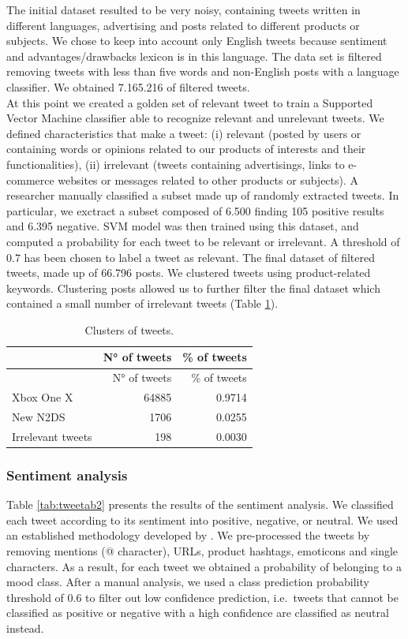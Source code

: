 \documentclass[]{book}
\begin{document}
The initial dataset resulted to be very noisy, containing tweets written
in different languages, advertising and posts related to different
products or subjects. We chose to keep into account only English tweets
because sentiment and advantages/drawbacks lexicon is in this language.
The data set is filtered removing tweets with less than five words and
non-English posts with a language classifier. We obtained 7.165.216 of
filtered tweets.\\
At this point we created a golden set of relevant tweet to train a
Supported Vector Machine classifier able to recognize relevant and
unrelevant tweets. We defined characteristics that make a tweet: (i)
relevant (posted by users or containing words or opinions related to our
products of interests and their functionalities), (ii) irrelevant
(tweets containing advertisings, links to e-commerce websites or
messages related to other products or subjects). A researcher manually
classified a subset made up of randomly extracted tweets. In particular,
we exctract a subset composed of 6.500 finding 105 positive results and
6.395 negative. SVM model was then trained using this dataset, and
computed a probability for each tweet to be relevant or irrelevant. A
threshold of 0.7 has been chosen to label a tweet as relevant. The final
dataset of filtered tweets, made up of 66.796 posts. We clustered tweets
using product-related keywords. Clustering posts allowed us to further
filter the final dataset which contained a small number of irrelevant
tweets (Table \ref{tab:tweetab1}).

\begin{longtable}[]{@{}lrr@{}}
\caption{\label{tab:tweetab1} Clusters of tweets.}\tabularnewline
\toprule
& N° of tweets & \% of tweets\tabularnewline
\midrule
\endfirsthead
\toprule
& N° of tweets & \% of tweets\tabularnewline
\midrule
\endhead
Xbox One X & 64885 & 0.9714\tabularnewline
New N2DS & 1706 & 0.0255\tabularnewline
Irrelevant tweets & 198 & 0.0030\tabularnewline
\bottomrule
\end{longtable}

\subsubsection*{Sentiment analysis}\label{sentiment-analysis}

Table \ref{tab:tweetab2} presents the results of the sentiment analysis.
We classified each tweet according to its sentiment into positive,
negative, or neutral. We used an established methodology developed by
\citep{cimino2014linguistically}. We pre-processed the tweets by
removing mentions (@ character), URLs, product hashtags, emoticons and
single characters. As a result, for each tweet we obtained a probability
of belonging to a mood class. After a manual analysis, we used a class
prediction probability threshold of 0.6 to filter out low confidence
prediction, i.e.~tweets that cannot be classified as positive or
negative with a high confidence are classified as neutral instead.
\end{document}
